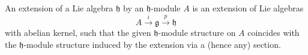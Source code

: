 An extension of a Lie algebra $\mathfrak{h}$ by an $\mathfrak{h}$-module $A$ is an extension of Lie algebras
$$A \xrightarrow{i} \mathfrak{g} \xrightarrow{p} \mathfrak{h}$$
with abelian kernel, such that the given $\mathfrak{h}$-module structure on $A$ coincides with the $\mathfrak{h}$-module structure induced by the extension via a (hence any) section.
